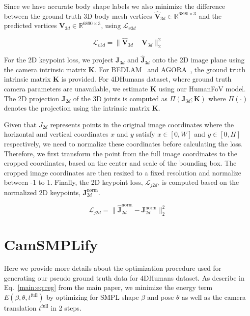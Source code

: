 Since we have accurate body shape labels we also minimize the difference between the ground truth 3D body mesh vertices $\hat{\mathbf{V}}_{3d} \in \mathbb{R}^{6890 \times 3}$ and the predicted vertices $\mathbf{V}_{3d} \in \mathbb{R}^{6890 \times 3}$, using $\mathcal{L}_{v3d}$

\begin{equation}
\mathcal{L}_{v3d}  = \|\hat{\mathbf{V}}_{3d} - \mathbf{V}_{3d}\|_2^2
\end{equation}

For the 2D keypoint loss, we project ${\mathbf{J}}_{3d}$ and $\hat{\mathbf{J}}_{3d}$ onto the 2D image plane using the camera intrinsic matrix $\mathbf{K}$. For BEDLAM~\cite{bedlam} and AGORA~\cite{agora}, the ground truth intrinsic matrix $\mathbf{K}$ is provided. For 4DHumans dataset, where ground truth camera parameters are unavailable, we estimate $\mathbf{K}$ using our HumanFoV model. The 2D projection ${\mathbf{J}}_{2d}$ of the 3D joints is computed as $\Pi({\mathbf{J}}_{3d}; \mathbf{K})$ where $\Pi(\cdot)$ denotes the projection using the intrinsic matrix $\mathbf{K}$. 

Given that $ J_{2d} $ represents points in the original image coordinates where the horizontal and vertical coordinates $ x $ and $ y $ satisfy $ x \in [0, W] $ and $ y \in [0, H] $ respectively, we need to normalize these coordinates before calculating the loss. Therefore, we first transform the point from the full image coordinates to the cropped coordinates, based on the center and scale of the bounding box. The cropped image coordinates are then resized to a fixed resolution and normalize between -1 to 1.  Finally, the 2D keypoint loss, $\mathcal{L}_{j2d}$, is computed based on the normalized 2D keypoints, $\mathbf{J}_{2d}^{\text{norm}}$.

\begin{equation}
\mathcal{L}_{j2d} = \|\hat{\mathbf{J}}_{2d}^{\text{norm}} - \mathbf{J}_{2d}^{\text{norm}}\|_2^2
\end{equation}

\section{CamSMPLify}
Here we provide more details about the optimization procedure used for generating our pseudo ground truth data for 4DHumans dataset. As describe in Eq.~\ref{main:eq:reg} from the main paper, we minimize the energy term $E(\beta, \theta, t^{\text{full}})$ by optimizing for SMPL shape $\beta$ and pose $\theta$ as well as the camera translation $t^{\text{full}}$ in 2 steps.



